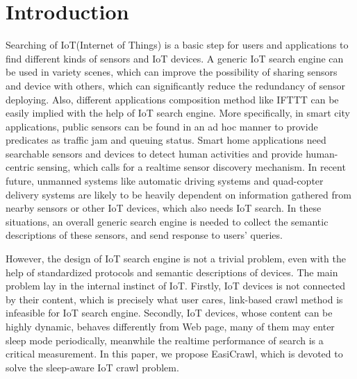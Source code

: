 \documentclass[conference]{IEEEtran}
\begin{document}
\IEEEpeerreviewmaketitle

\section{Introduction}
Searching of IoT(Internet of Things) is a basic step for users and applications to find different kinds of sensors and IoT devices. 
A generic IoT search engine can be used in variety scenes, which can improve the possibility of sharing sensors and device with others, which can significantly reduce the redundancy of sensor deploying. Also, different applications composition method like IFTTT\cite{ifttt} can be easily implied with the help of IoT search engine.
More specifically, in smart city applications, public sensors can be found in an ad hoc manner to provide predicates as traffic jam and queuing status. 
Smart home applications need searchable sensors and devices to detect human activities and provide human-centric sensing, which calls for a realtime sensor discovery mechanism. In recent future, unmanned systems like automatic driving systems and quad-copter delivery systems are likely to be heavily dependent on information gathered from nearby sensors or other IoT devices, which also needs IoT search. In these situations, an overall generic search engine is needed to collect the semantic descriptions of these sensors, and send response to users' queries. 


However, the design of IoT search engine is not a trivial problem, even with the help of standardized protocols and semantic descriptions of devices. The main problem lay in the internal instinct of IoT. Firstly, IoT devices is not connected by their content, which is precisely what user cares, link-based crawl method is infeasible for IoT search engine. Secondly, IoT devices, whose content can be highly dynamic, behaves differently from Web page, many of them may enter sleep mode periodically, meanwhile the realtime performance of search is a critical measurement. In this paper, we propose EasiCrawl, which is devoted to solve the sleep-aware IoT crawl problem.
\end{document}

